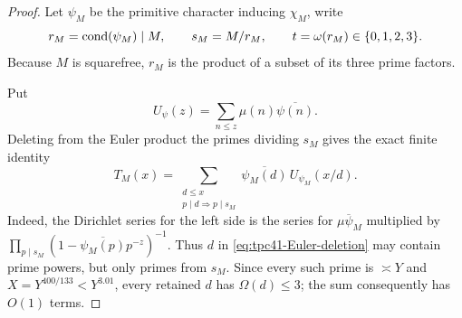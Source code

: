 \begin{proof}
Let \(\psi_M\) be the primitive character inducing \(\chi_M\), write
\begin{equation}
 r_M=\operatorname{cond}(\psi_M)\mid M,
 \qquad s_M=M/r_M,
 \qquad t=\omega(r_M)\in\{0,1,2,3\}.
 \label{eq:tpc41-conductor-layer}
\end{equation}
Because \(M\) is squarefree, \(r_M\) is the product of a subset of its
three prime factors.

Put
\begin{equation}
 U_\psi(z)=\sum_{n\le z}\mu(n)\overline{\psi(n)}.
 \label{eq:tpc41-Upsi}
\end{equation}
Deleting from the Euler product the primes dividing \(s_M\) gives the
exact finite identity
\begin{equation}
 T_M(x)
 =\sum_{\substack{d\le x\\p\mid d\Rightarrow p\mid s_M}}
   \overline{\psi_M(d)}\,U_{\psi_M}(x/d).
 \label{eq:tpc41-Euler-deletion}
\end{equation}
Indeed, the Dirichlet series for the left side is the series for
\(\mu\overline\psi_M\) multiplied by
\(\prod_{p\mid s_M}(1-\overline{\psi_M(p)}p^{-z})^{-1}\).
Thus \(d\) in \eqref{eq:tpc41-Euler-deletion} may contain prime powers,
but only primes from \(s_M\).  Since every such prime is \(\asymp Y\) and
\(X=Y^{400/133}<Y^{3.01}\), every retained \(d\) has
\(\Omega(d)\le3\); the sum consequently has \(O(1)\) terms.


\end{proof}
